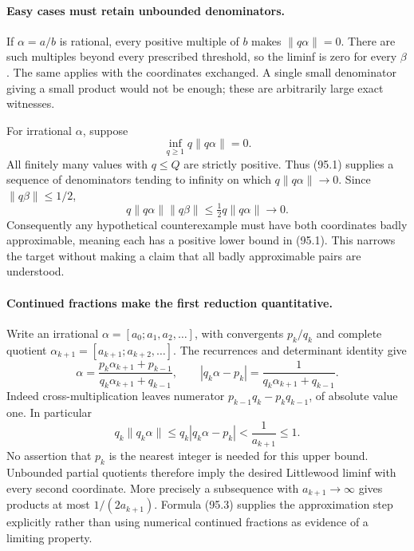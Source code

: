 \documentclass[11pt]{article}
\begin{document}
\paragraph{Easy cases must retain unbounded denominators.}
If $\alpha=a/b$ is rational, every positive multiple of $b$ makes
$\|q\alpha\|=0$. There are such multiples beyond every prescribed
threshold, so the liminf is zero for every $\beta$. The same applies with
the coordinates exchanged. A single small denominator giving a small
product would not be enough; these are arbitrarily large exact witnesses.

For irrational $\alpha$, suppose
\[
                         \inf_{q\geq1}q\|q\alpha\|=0.  \tag{95.1}
\]
All finitely many values with $q\leq Q$ are strictly positive. Thus (95.1)
supplies a sequence of denominators tending to infinity on which
$q\|q\alpha\|\to0$. Since $\|q\beta\|\leq1/2$,
\[
 q\|q\alpha\|\|q\beta\|\leq\tfrac12 q\|q\alpha\|
                          \longrightarrow0.            \tag{95.2}
\]
Consequently any hypothetical counterexample must have both coordinates
badly approximable, meaning each has a positive lower bound in (95.1).
This narrows the target without making a claim that all badly approximable
pairs are understood.

\paragraph{Continued fractions make the first reduction quantitative.}
Write an irrational $\alpha=[a_0;a_1,a_2,\ldots]$, with convergents
$p_k/q_k$ and complete quotient
$\alpha_{k+1}=[a_{k+1};a_{k+2},\ldots]$. The recurrences and determinant
identity give
\[
 \alpha=\frac{p_k\alpha_{k+1}+p_{k-1}}
                {q_k\alpha_{k+1}+q_{k-1}},\qquad
 |q_k\alpha-p_k|=\frac1{q_k\alpha_{k+1}+q_{k-1}}.
                                                               \tag{95.3}
\]
Indeed cross-multiplication leaves numerator
$p_{k-1}q_k-p_kq_{k-1}$, of absolute value one. In particular
\[
 q_k\|q_k\alpha\|\leq q_k|q_k\alpha-p_k|
                         <\frac1{a_{k+1}}\leq1.        \tag{95.4}
\]
No assertion that $p_k$ is the nearest integer is needed for this upper
bound. Unbounded partial quotients therefore imply the desired Littlewood
liminf with every second coordinate. More precisely a subsequence with
$a_{k+1}\to\infty$ gives products at most $1/(2a_{k+1})$.
Formula (95.3) supplies the approximation step explicitly rather than
using numerical continued fractions as evidence of a limiting property.
\end{document}
